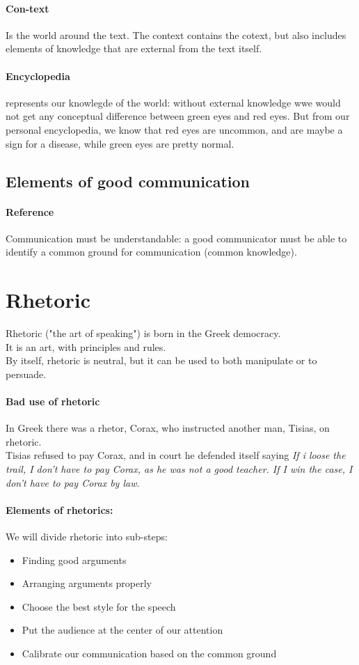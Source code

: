 \documentclass{article}
\begin{document}
\paragraph{Con-text} Is the world around the text. The context contains the cotext, but also includes elements of knowledge that are external from the text itself.
\paragraph{Encyclopedia} represents our knowlegde of the world: without external knowledge wwe would not get any conceptual difference between green eyes and red eyes. But from our personal encyclopedia, we know that red eyes are uncommon, and are maybe a sign for a disease, while green eyes are pretty normal.

\subsection{Elements of good communication}
\paragraph{Reference} Communication must be understandable: a good communicator must be able to identify a common ground for communication (common knowledge).




\section{Rhetoric}
Rhetoric ("the art of speaking") is born in the Greek democracy.\\
It is an art, with principles and rules.\\
By itself, rhetoric is neutral, but it can be used to both manipulate or to persuade.\\
\paragraph{Bad use of rhetoric} In Greek there was a rhetor, Corax, who instructed another man, Tisias, on rhetoric.\\
Tisias refused to pay Corax, and in court he defended itself saying \textit{If i loose the trail, I don't have to pay Corax, as he was not a good teacher. If I win the case, I don't have to pay Corax by law}.
\paragraph{Elements of  rhetorics:} We will divide rhetoric into sub-steps:
\begin{itemize}
\item Finding good arguments
\item Arranging arguments properly
\item Choose the best style for the speech
\item Put the audience at the center of our attention
\item Calibrate our communication based on the common ground
\end{itemize}
\end{document}
